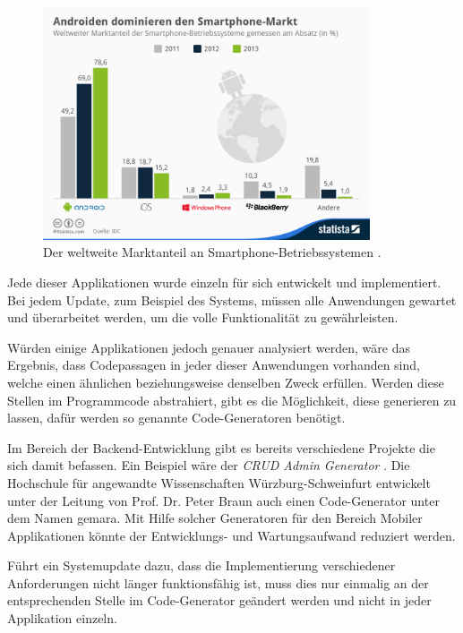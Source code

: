 \begin{figure}[H]
	\begin{center}
		\includegraphics[width=0.86\textwidth]{images/os.jpg}
		\caption{Der weltweite Marktanteil an Smartphone-Betriebssystemen \cite{os}.}
		\label{fig:os_fig}
	\end{center}
\end{figure}

Jede dieser Applikationen wurde einzeln für sich entwickelt und implementiert. Bei jedem Update, zum Beispiel des Systems, müssen alle Anwendungen gewartet und überarbeitet werden, um die volle Funktionalität zu gewährleisten.

Würden einige Applikationen jedoch genauer analysiert werden, wäre das Ergebnis, dass Codepassagen in jeder dieser Anwendungen vorhanden sind, welche einen ähnlichen beziehungsweise denselben Zweck erfüllen. Werden diese Stellen im Programmcode abstrahiert, gibt es die Möglichkeit, diese generieren zu lassen, dafür werden so genannte Code-Generatoren benötigt. 

Im Bereich der Backend-Entwicklung gibt es bereits verschiedene Projekte die sich damit befassen. Ein Beispiel wäre der \textit{CRUD Admin Generator} \cite{generators}. Die Hochschule für angewandte Wissenschaften Würzburg-Schweinfurt entwickelt  unter der Leitung von Prof. Dr. Peter Braun auch einen Code-Generator unter dem Namen \ac{gemara}. Mit Hilfe solcher Generatoren für den Bereich Mobiler Applikationen könnte der Entwicklungs- und Wartungsaufwand reduziert werden. 

Führt ein Systemupdate dazu, dass die Implementierung verschiedener Anforderungen nicht länger funktionsfähig ist, muss dies nur einmalig an der entsprechenden Stelle im Code-Generator geändert werden und nicht in jeder Applikation einzeln. 

